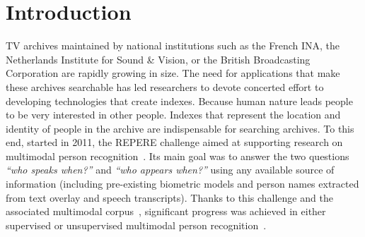 \section{Introduction}

TV archives maintained by national institutions such as the French INA, the Netherlands Institute for Sound \& Vision, or the British Broadcasting Corporation are rapidly growing in size. The need for applications that make these archives searchable has led researchers to devote concerted effort to developing technologies that create indexes.
%
Because human nature leads people to be very interested in other people.
Indexes that represent the location and identity of people in the archive are indispensable for searching archives.
%
To this end, started in 2011, the REPERE challenge aimed at supporting research on multimodal person recognition~\cite{BERNARD--SLAM--2013, KAHN--CBMI--2012}. Its main goal was to answer the two questions \emph{``who speaks when?''} and \emph{``who appears when?''} using any available source of information (including pre-existing biometric models and person names extracted from text overlay and speech transcripts). 
%
Thanks to this challenge and the associated multimodal corpus~\cite{GIRAUDEL--LREC--2012}, significant progress was achieved in either supervised or unsupervised multimodal person recognition~\cite{BECHET--INTERSPEECH--2014, BREDIN--ODYSSEY--2014, BREDIN--IJMIR--2014, GAY--CBMI--2014, POIGNANT--ASLP--2015, POIGNANT--INTERSPEECH--2012, POIGNANT--MTAP--2015, ROUVIER--CBMI--2014}.

